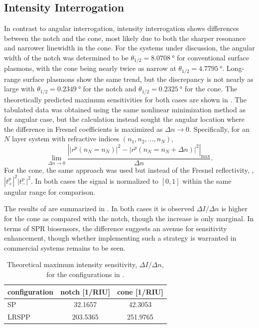 \subsection{Intensity Interrogation}

In contrast to angular interrogation, intensity interrogation shows
differences between the notch and the cone, most likely due to both the
sharper resonance and narrower linewidth in the cone.  For the systems under
discussion, the angular width of the notch was determined to be
$\theta_{1/2}=\SI{8.0708}{\degree}$ for conventional surface plasmons, with
the cone being nearly twice as narrow at $\theta_{1/2}=\SI{4.7795}{\degree}$.
Long-range surface plasmons show the same trend, but the discrepancy is not
nearly as large with $\theta_{1/2}=\SI{0.2349}{\degree}$ for the notch and
$\theta_{1/2}=\SI{0.2325}{\degree}$ for the cone.  The theoretically predicted
maximum sensitivities for both cases are shown in .
The tabulated data was obtained using the same nonlinear minimization method
as for angular case, but the calculation instead sought the angular location where the
difference in Fresnel coefficients is maximized as $\Delta n \to 0$.
Specifically, for an $N$ layer system with refractive indices $(n_1,n_2,
\ldots,n_N)$,
\begin{equation}
\lim_{\Delta n \to 0}\frac{\left||r^p(n_N=n_N)|^2 - |r^p(n_N=n_N + \Delta
				n)|^2\right|_\mathrm{max}}{\Delta n}.
\label{eqn:fresnelsenspertrubation}
\end{equation}
For the cone, the same approach was used but instead of the Fresnel
reflectivity, , $|t^p_+|^2|t^p_-|^2$.  In
both cases the signal is normalized to $[0,1]$ within the same angular range
for comparison.

The results of are summarized in
.  In both cases it is observed $\Delta I/\Delta
n$ is higher for the cone as compared with the notch, though the increase
is only marginal.  In terms of SPR biosensors, the difference suggests an
avenue for sensitivity enhancement, though whether implementing such a
strategy is warranted in commercial systems remains to be seen.
\begin{table}[ht]
\centering
{}
\begin{tabular}{lSS}
\toprule
{configuration} & {notch [1/RIU]} & {cone [1/RIU]} \\
\midrule
SP & 32.1657 & 42.3053 \\
LRSPP & 203.5365 & 251.9765 \\
\bottomrule
\end{tabular}
\caption{Theoretical maximum intensity sensitivity, $\Delta I/\Delta n$,
								for the configurations in . }
\label{tbl:intensitysens}
\end{table}

